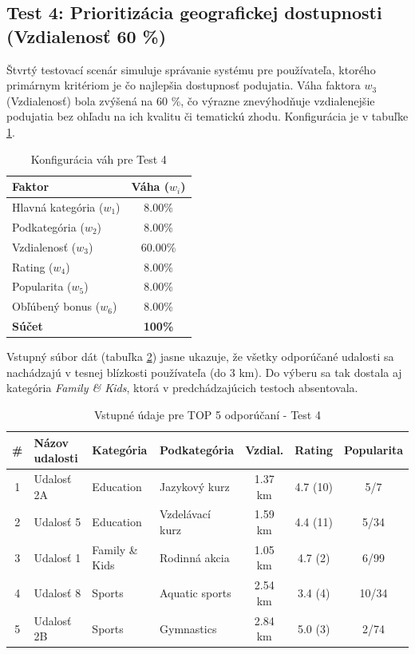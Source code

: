 \subsection{Test 4: Prioritizácia geografickej dostupnosti (Vzdialenosť 60 \%)}

Štvrtý testovací scenár simuluje správanie systému pre používateľa, ktorého primárnym kritériom je čo najlepšia dostupnosť podujatia. Váha faktora $w_3$ (Vzdialenosť) bola zvýšená na 60 \%, čo výrazne znevýhodňuje vzdialenejšie podujatia bez ohľadu na ich kvalitu či tematickú zhodu. Konfigurácia je v tabuľke \ref{tab:vahy_test4}.

\begin{table}[H]
\centering
\begin{tabular}{|l|c|}
\hline
\textbf{Faktor} & \textbf{Váha ($w_i$)} \\
\hline
Hlavná kategória ($w_1$) & 8.00\% \\
Podkategória ($w_2$) & 8.00\% \\
Vzdialenosť ($w_3$) & 60.00\% \\
Rating ($w_4$) & 8.00\% \\
Popularita ($w_5$) & 8.00\% \\
Obľúbený bonus ($w_6$) & 8.00\% \\
\hline
\textbf{Súčet} & \textbf{100\%} \\
\hline
\end{tabular}
\caption{Konfigurácia váh pre Test 4}
\label{tab:vahy_test4}
\end{table}

Vstupný súbor dát (tabuľka \ref{tab:data_test4}) jasne ukazuje, že všetky odporúčané udalosti sa nachádzajú v tesnej blízkosti používateľa (do 3 km). Do výberu sa tak dostala aj kategória \textit{Family \& Kids}, ktorá v predchádzajúcich testoch absentovala.

\begin{table}[H]
\centering
\small
\begin{tabular}{|c|l|l|l|c|c|c|}
\hline
\textbf{\#} & \textbf{Názov udalosti} & \textbf{Kategória} & \textbf{Podkategória} & \textbf{Vzdial.} & \textbf{Rating} & \textbf{Popularita} \\
\hline
1 & Udalosť 2A & Education      & Jazykový kurz   & 1.37 km & 4.7 (10) & 5/7 \\
2 & Udalosť 5  & Education      & Vzdelávací kurz & 1.59 km & 4.4 (11) & 5/34 \\
3 & Udalosť 1  & Family \& Kids & Rodinná akcia   & 1.05 km & 4.7 (2)  & 6/99 \\
4 & Udalosť 8  & Sports         & Aquatic sports  & 2.54 km & 3.4 (4)  & 10/34 \\
5 & Udalosť 2B & Sports         & Gymnastics      & 2.84 km & 5.0 (3)  & 2/74 \\
\hline
\end{tabular}
\caption{Vstupné údaje pre TOP 5 odporúčaní - Test 4}
\label{tab:data_test4}
\end{table}

